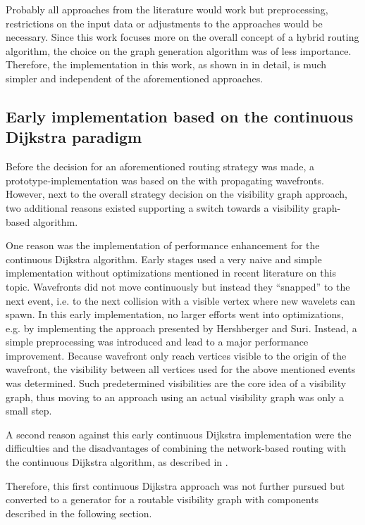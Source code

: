 		Probably all approaches from the literature would work but preprocessing, restrictions on the input data or adjustments to the approaches would be necessary.
		Since this work focuses more on the overall concept of a hybrid routing algorithm, the choice on the graph generation algorithm was of less importance.
		Therefore, the implementation in this work, as shown in  in detail, is much simpler and independent of the aforementioned approaches.
		
	\subsection{Early implementation based on the continuous Dijkstra paradigm}
		
		Before the decision for an aforementioned routing strategy was made, a prototype-implementation was based on the  with propagating wavefronts.
		However, next to the overall strategy decision on the visibility graph approach, two additional reasons existed supporting a switch towards a visibility graph-based algorithm.
		
		One reason was the implementation of performance enhancement for the continuous Dijkstra algorithm.
		Early stages used a very naive and simple implementation without optimizations mentioned in recent literature on this topic.
		Wavefronts did not move continuously but instead they \enquote{snapped} to the next event, i.e. to the next collision with a visible vertex where new wavelets can spawn.
		In this early implementation, no larger efforts went into optimizations, e.g. by implementing the approach presented by Hershberger and Suri\cite{hershberger-suri}.
		Instead, a simple preprocessing was introduced and lead to a major performance improvement.
		Because wavefront only reach vertices visible to the origin of the wavefront, the visibility between all vertices used for the above mentioned events was determined.
		Such predetermined visibilities are the core idea of a visibility graph, thus moving to an approach using an actual visibility graph was only a small step.
		
		A second reason against this early continuous Dijkstra implementation were the difficulties and the disadvantages of combining the network-based routing with the continuous Dijkstra algorithm, as described in .
		
		Therefore, this first continuous Dijkstra approach was not further pursued but converted to a generator for a routable visibility graph with components described in the following section.
	
